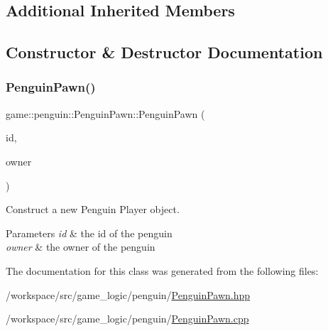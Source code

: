\subsection*{Additional Inherited Members}


\subsection{Constructor \& Destructor Documentation}
\mbox{\label{classgame_1_1penguin_1_1_penguin_pawn_a8115a301c726af8951a29560b456abca}} 
\subsubsection{\texorpdfstring{Penguin\+Pawn()}{PenguinPawn()}}
{\footnotesize\ttfamily game\+::penguin\+::\+Penguin\+Pawn\+::\+Penguin\+Pawn (\begin{DoxyParamCaption}\item[{unsigned int}]{id,  }\item[{\hyperlink{classgame_1_1penguin_1_1_human_player}{Human\+Player} $\ast$}]{owner }\end{DoxyParamCaption})\hspace{0.3cm}{\ttfamily [explicit]}}



Construct a new Penguin Player object. 


\begin{DoxyParams}{Parameters}
{\em id} & the id of the penguin \\
\hline
{\em owner} & the owner of the penguin \\
\hline
\end{DoxyParams}


The documentation for this class was generated from the following files\+:\begin{DoxyCompactItemize}
\item 
/workspace/src/game\+\_\+logic/penguin/\hyperlink{_penguin_pawn_8hpp}{Penguin\+Pawn.\+hpp}\item 
/workspace/src/game\+\_\+logic/penguin/\hyperlink{_penguin_pawn_8cpp}{Penguin\+Pawn.\+cpp}\end{DoxyCompactItemize}

